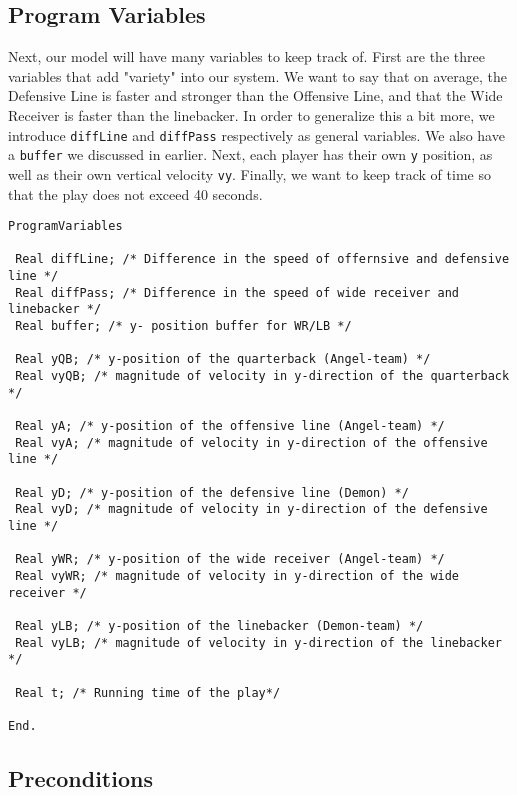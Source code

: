 \subsection{Program Variables}

\quad Next, our model will have many variables to keep track of. First are the three variables that add "variety" into our system. We want to say that on average, the Defensive Line is faster and stronger than the Offensive Line, and that the Wide Receiver is faster than the linebacker. In order to generalize this a bit more, we introduce \texttt{diffLine} and \texttt{diffPass} respectively as general variables. We also have a \texttt{buffer} we discussed in earlier. Next, each player has their own \texttt{y} position, as well as their own vertical velocity \texttt{vy}. Finally, we want to keep track of time so that the play does not exceed 40 seconds.

\begin{lstlisting}
ProgramVariables

 Real diffLine; /* Difference in the speed of offernsive and defensive line */
 Real diffPass; /* Difference in the speed of wide receiver and linebacker */
 Real buffer; /* y- position buffer for WR/LB */

 Real yQB; /* y-position of the quarterback (Angel-team) */
 Real vyQB; /* magnitude of velocity in y-direction of the quarterback */

 Real yA; /* y-position of the offensive line (Angel-team) */
 Real vyA; /* magnitude of velocity in y-direction of the offensive line */

 Real yD; /* y-position of the defensive line (Demon) */
 Real vyD; /* magnitude of velocity in y-direction of the defensive line */

 Real yWR; /* y-position of the wide receiver (Angel-team) */
 Real vyWR; /* magnitude of velocity in y-direction of the wide receiver */

 Real yLB; /* y-position of the linebacker (Demon-team) */
 Real vyLB; /* magnitude of velocity in y-direction of the linebacker */

 Real t; /* Running time of the play*/

End.
\end{lstlisting}

\subsection{Preconditions}

